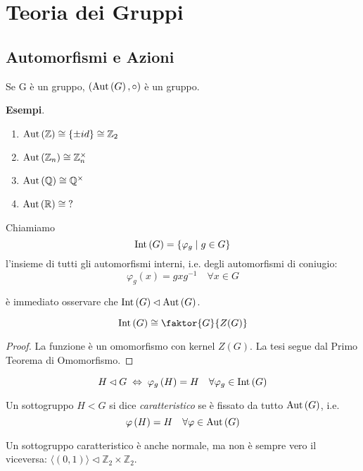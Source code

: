 \setcounter{section}{6} %
\section{Teoria dei Gruppi}
\subsection{Automorfismi e Azioni}
\begin{multicols}{2}
\begin{theorem}
	Se G è un gruppo, $ \left(\mathrm{Aut}\left( G \right), \circ\right) $ è un gruppo.
\end{theorem}

\textbf{Esempi}.
\begin{enumerate}
	\item $ \mathrm{Aut}\left( \mathbb{Z} \right) \cong \{\pm id\} \cong \mathbb{Z}_2 $
	\item $ \mathrm{Aut}\left( \mathbb{Z}_n \right) \cong \mathbb{Z}_n^\times $
	\item $ \mathrm{Aut}\left( \mathbb{Q} \right) \cong \mathbb{Q}^\times $
	\item $ \mathrm{Aut}\left( \mathbb{R} \right) \cong \; ? $
\end{enumerate} 

\begin{definition}
	Chiamiamo $$  \mathrm{Int}\left( G \right) = \{ \varphi_g \mid g \in G \}  $$ l'insieme di tutti gli automorfismi interni, i.e. degli automorfismi di coniugio: \[ \varphi_g(x) = gxg^{-1} \quad\forall x \in G \]
\end{definition}

è immediato osservare che $ \mathrm{Int}\left( G \right) \lhd \mathrm{Aut}\left( G \right) $.

\begin{prop}
	\[ \Int{G} \cong \faktor{G}{Z(G)} \]
\end{prop}
\begin{proof}
	La funzione  è un omomorfismo con kernel $ Z(G) $. La tesi segue dal Primo Teorema di Omomorfismo.
\end{proof}

\begin{remark}
	\[ H \lhd G \;\Leftrightarrow\; \varphi_g\left(H\right) = H \quad \forall \varphi_g \in \mathrm{Int}\left( G \right) \]
\end{remark}

\begin{definition}
	Un sottogruppo $ H < G $ si dice \emph{caratteristico} se è fissato da tutto $ \mathrm{Aut}\left( G \right) $, i.e. $$ \varphi\left(H\right) = H \quad \forall \varphi \in \mathrm{Aut}\left( G \right) $$
\end{definition}
\begin{remark}
	Un sottogruppo caratteristico è anche normale, ma non è sempre vero il viceversa: $ \langle (0, 1) \rangle \lhd \mathbb{Z}_2 \times \mathbb{Z}_2 $.
\end{remark}


\end{multicols}
